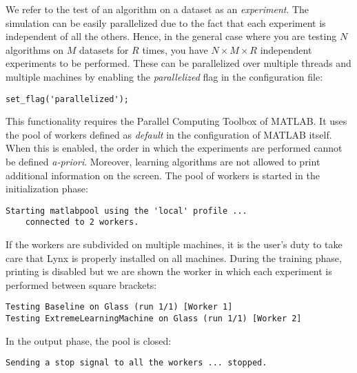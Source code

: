 We refer to the test of an algorithm on a dataset as an \textit{experiment}. The simulation can be easily parallelized due to the fact that each experiment is independent of all the others. Hence, in the general case where you are testing $N$ algorithms on $M$ datasets for $R$ times, you have $N \times M \times R$ independent experiments to be performed. These can be parallelized over multiple threads and multiple machines by enabling the \textit{parallelized} flag in the configuration file:

\begin{lstlisting}
set_flag('parallelized');
\end{lstlisting}

\noindent This functionality requires the Parallel Computing Toolbox of MATLAB. It uses the pool of workers defined as \textit{default} in the configuration of MATLAB itself. When this is enabled, the order in which the experiments are performed cannot be defined \textit{a-priori}. Moreover, learning algorithms are not allowed to print additional information on the screen. The pool of workers is started in the initialization phase:

\begin{small}
\begin{verbatim}
Starting matlabpool using the 'local' profile ... 
	connected to 2 workers.
\end{verbatim}
\end{small}

\noindent If the workers are subdivided on multiple machines, it is the user's duty to take care that Lynx is properly installed on all machines. During the training phase, printing is disabled but we are shown the worker in which each experiment is performed between square brackets:

\begin{small}
\begin{verbatim}
Testing Baseline on Glass (run 1/1) [Worker 1]
Testing ExtremeLearningMachine on Glass (run 1/1) [Worker 2]
\end{verbatim}
\end{small}

\noindent In the output phase, the pool is closed:

\begin{small}
\begin{verbatim}
Sending a stop signal to all the workers ... stopped.
\end{verbatim}
\end{small}

